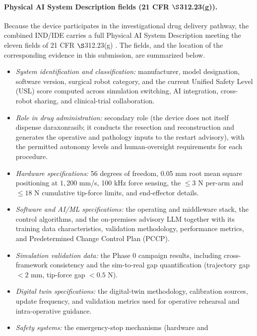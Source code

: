 \paragraph{Physical AI System Description fields (21 CFR $\S$312.23(g)).}
Because the device participates in the investigational drug delivery pathway, the
combined IND/IDE carries a full Physical AI System Description meeting the eleven
fields of 21 CFR $\S$312.23(g) \cite{kawchak2026adapt312}. The fields, and the
location of the corresponding evidence in this submission, are summarized below.

\begin{itemize}[leftmargin=1.4em,itemsep=1pt,topsep=2pt]
\item[(i)] \textit{System identification and classification:} manufacturer, model
designation, software version, surgical robot category, and the current Unified
Safety Level (USL) score computed across simulation switching, AI integration,
cross-robot sharing, and clinical-trial collaboration.
\item[(ii)] \textit{Role in drug administration:} secondary role (the device does
not itself dispense daraxonrasib; it conducts the resection and reconstruction and
generates the operative and pathology inputs to the restart advisory), with the
permitted autonomy levels and human-oversight requirements for each procedure.
\item[(iii)] \textit{Hardware specifications:} 56 degrees of freedom, 0.05 mm root
mean square positioning at $1{,}200$ mm/s, 100 kHz force sensing, the $\leq 3$ N
per-arm and $\leq 18$ N cumulative tip-force limits, and end-effector details.
\item[(iv)] \textit{Software and AI/ML specifications:} the operating and
middleware stack, the control algorithms, and the on-premises advisory LLM
together with its training data characteristics, validation methodology,
performance metrics, and Predetermined Change Control Plan (PCCP).
\item[(v)] \textit{Simulation validation data:} the Phase 0 campaign results,
including cross-framework consistency and the sim-to-real gap quantification
(trajectory gap $< 2$ mm, tip-force gap $< 0.5$ N).
\item[(vi)] \textit{Digital twin specifications:} the digital-twin methodology,
calibration sources, update frequency, and validation metrics used for operative
rehearsal and intra-operative guidance.
\item[(vii)] \textit{Safety systems:} the emergency-stop mechanisms (hardware and

\end{itemize}
